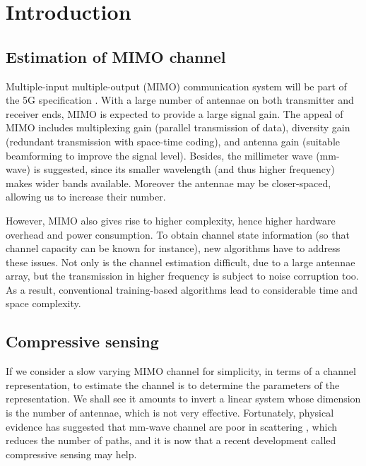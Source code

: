 \chapter {Introduction}

\section {Estimation of MIMO channel}

Multiple-input multiple-output (MIMO) communication system will be part of the 5G specification \cite {RSM13}.
With a large number of antennae on both transmitter and receiver ends, MIMO is expected to provide a large signal gain.
The appeal of MIMO includes multiplexing gain (parallel transmission of data), diversity gain (redundant transmission with space-time coding), and antenna gain (suitable beamforming to improve the signal level).
Besides, the millimeter wave (mm-wave) is suggested, since its smaller wavelength (and thus higher frequency) makes wider bands available.
Moreover the antennae may be closer-spaced, allowing us to increase their number.

However, MIMO also gives rise to higher complexity, hence higher hardware overhead and power consumption.
To obtain channel state information (so that channel capacity can be known for instance), new algorithms have to address these issues.
Not only is the channel estimation difficult, due to a large antennae array, but the transmission in higher frequency is subject to noise corruption too.
As a result, conventional training-based algorithms lead to considerable time and space complexity.



\section {Compressive sensing}

If we consider a slow varying MIMO channel for simplicity, in terms of a channel representation, to estimate the channel is to determine the parameters of the representation.
We shall see it amounts to invert a linear system whose dimension is the number of antennae, which is not very effective.
Fortunately, physical evidence has suggested that mm-wave channel are poor in scattering \cite {ALS14}, which reduces the number of paths, and it is now that a recent development called compressive sensing may help.

